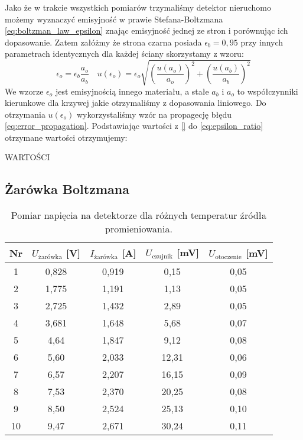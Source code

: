 \documentclass[12pt]{article}
\begin{document}
Jako że w trakcie wszystkich pomiarów trzymaliśmy detektor nieruchomo możemy wyznaczyć emisyjność w prawie Stefana-Boltzmana \eqref{eq:boltzman_law_epsilon} znając emisyjność jednej ze stron i porównując ich dopasowanie.
Zatem załóżmy że strona czarna posiada $\epsilon_b = 0{,}95$ przy innych parametrach identycznych dla każdej ściany skorzystamy z wzoru:
\begin{equation}
    \epsilon_o = \epsilon_b \frac{a_o}{a_b} \quad u(\epsilon_o) = \epsilon_o \sqrt{(\frac{u(a_o)}{a_o})^2 + (\frac{u(a_b)}{a_b})^2}
    \label{eq:epsilon_ratio}
\end{equation}
We wzorze $\epsilon_o$ jest emisyjnością innego materiału, a stałe $a_b$ i $a_o$ to współczynniki kierunkowe dla krzywej jakie otrzymaliśmy z dopasowania liniowego. Do otrzymania $u(\epsilon_o)$ wykorzystaliśmy wzór na propagecję błędu \eqref{eq:error_propagation}.
Podstawiając wartości z \eqref{} do \eqref{eq:epsilon_ratio} otrzymane wartości otrzymujemy:

WARTOŚCI

\subsection{Żarówka Boltzmana}
\begin{table}[H]
    \centering
    \begin{tabular}{c|cc|c|c}
        \toprule
        Nr & $U_\text{żarówka}$ [V] & $I_\text{żarówka}$ [A] & $U_\text{czujnik}$ [mV] & $U_\text{otoczenie}$ [mV] \\
        \midrule
        1  & 0{,}828 & 0{,}919 & 0{,}15 & 0{,}05 \\
        2  & 1{,}775 & 1{,}191 & 1{,}13 & 0{,}05 \\
        3  & 2{,}725 & 1{,}432 & 2{,}89 & 0{,}05 \\
        4  & 3{,}681 & 1{,}648 & 5{,}68 & 0{,}07 \\
        5  & 4{,}64  & 1{,}847 & 9{,}12 & 0{,}08 \\
        6  & 5{,}60  & 2{,}033 & 12{,}31 & 0{,}06 \\
        7  & 6{,}57  & 2{,}207 & 16{,}15 & 0{,}09 \\
        8  & 7{,}53  & 2{,}370 & 20{,}25 & 0{,}08 \\
        9  & 8{,}50  & 2{,}524 & 25{,}13 & 0{,}10 \\
        10 & 9{,}47  & 2{,}671 & 30{,}24 & 0{,}11 \\
        \bottomrule
    \end{tabular}
    \caption{Pomiar napięcia na detektorze dla różnych temperatur źródła promieniowania.}
    \label{tab:temp_measurements}
\end{table}
\end{document}
